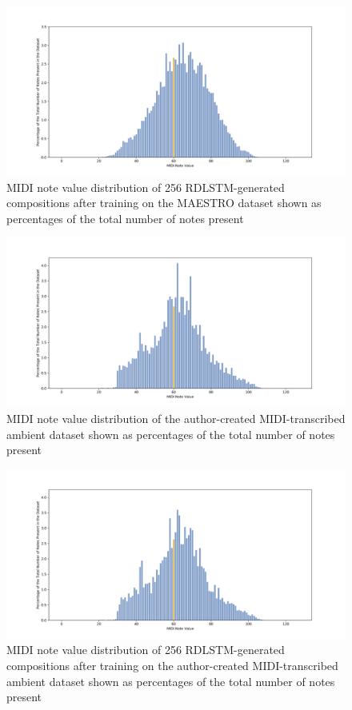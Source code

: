 \documentclass[12pt,]{article}
\begin{document}
\begin{figure}
\centering
\includegraphics{Images/classicnotegendistrib.png}
\caption{MIDI note value distribution of 256 RDLSTM-generated
compositions after training on the MAESTRO dataset shown as percentages
of the total number of notes present}
\end{figure}

\begin{figure}
\centering
\includegraphics{Images/ambientnotedistrib.png}
\caption{MIDI note value distribution of the author-created
MIDI-transcribed ambient dataset shown as percentages of the total
number of notes present}
\end{figure}

\begin{figure}
\centering
\includegraphics{Images/ambientnotegendistrib.png}
\caption{MIDI note value distribution of 256 RDLSTM-generated
compositions after training on the author-created MIDI-transcribed
ambient dataset shown as percentages of the total number of notes
present}
\end{figure}
\end{document}
